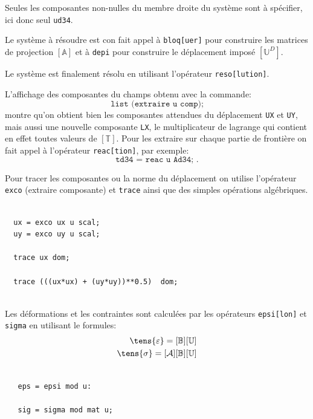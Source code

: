 Seules les composantes non-nulles du membre droite du système
sont à spécifier, ici donc seul \texttt{ud34}.   

Le système à résoudre est con fait appel à \texttt{bloq[uer]} 
pour construire les matrices de projection $[\mathbb{A}]$ 
et à \texttt{depi} pour construire le déplacement 
imposé $[\mathbb{U}^D]$. 

Le système est finalement résolu en utilisant l'opérateur 
\texttt{reso[lution]}. 

L'affichage des composantes du champs obtenu avec la commande:
$$ 
\texttt{  list (extraire u comp); }
$$ montre qu'on obtient bien 
les composantes attendues du déplacement \texttt{UX} et \texttt{UY}, mais 
aussi une nouvelle composante \texttt{LX}, le multiplicateur 
de lagrange qui contient en effet toutes valeurs de $[\mathbb{T}]$. 
Pour les extraire sur chaque partie de frontière on fait appel 
à l'opérateur \texttt{reac[tion]}, par exemple:
$$ 
\texttt{td34 = reac u Ad34; }.
$$
\begin{castemcom}

Pour tracer les composantes ou la norme du déplacement 
on utilise l'opérateur \texttt{exco} (extraire composante) 
et \texttt{trace} ainsi que des simples opérations 
algébriques.  

\end{castemcom}
\begin{castemlines}
\begin{verbatim}

  ux = exco ux u scal;
  uy = exco uy u scal;

  trace ux dom;
  
  trace (((ux*ux) + (uy*uy))**0.5)  dom;
  

\end{verbatim}
\end{castemlines}

\begin{castemcom}
Les déformations et les contraintes sont calculées par les opérateurs 
\texttt{epsi[lon]} et \texttt{sigma} en utilisant le formules:
\begin{eqnarray}
 \tens{\varepsilon} = [\mathbb{B}] [\mathbb{U}]
\\
  \tens{\sigma} = [{\cal A}] [\mathbb{B}] [\mathbb{U}]
\end{eqnarray}
\end{castemcom}
\begin{castemlines}
\begin{verbatim}

   eps = epsi mod u:
   
   sig = sigma mod mat u;  

\end{verbatim}
\end{castemlines}

